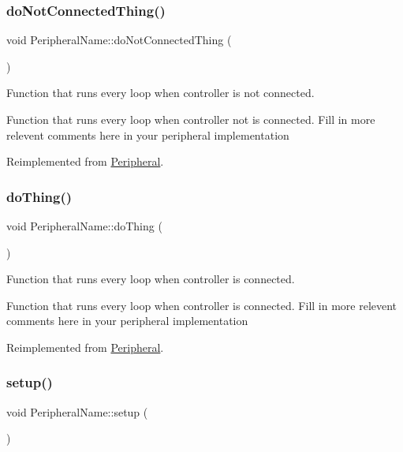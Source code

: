 \subsubsection{\texorpdfstring{do\+Not\+Connected\+Thing()}{doNotConnectedThing()}}
{\footnotesize\ttfamily void Peripheral\+Name\+::do\+Not\+Connected\+Thing (\begin{DoxyParamCaption}{ }\end{DoxyParamCaption})\hspace{0.3cm}{\ttfamily [virtual]}}



Function that runs every loop when controller is not connected. 

Function that runs every loop when controller not is connected. Fill in more relevent comments here in your peripheral implementation 

Reimplemented from \mbox{\hyperlink{class_peripheral_a331e23603fba1cebb2d4745d46ed2bfe}{Peripheral}}.

\mbox{\label{class_peripheral_name_a42388889799a14fd6cda2c2819b0e38d}} 
\subsubsection{\texorpdfstring{do\+Thing()}{doThing()}}
{\footnotesize\ttfamily void Peripheral\+Name\+::do\+Thing (\begin{DoxyParamCaption}{ }\end{DoxyParamCaption})\hspace{0.3cm}{\ttfamily [virtual]}}



Function that runs every loop when controller is connected. 

Function that runs every loop when controller is connected. Fill in more relevent comments here in your peripheral implementation 

Reimplemented from \mbox{\hyperlink{class_peripheral_a8643ea34b0c89019aeff10b0d2667e46}{Peripheral}}.

\mbox{\label{class_peripheral_name_aa6b1719095b6e25d80a2567f400316db}} 
\subsubsection{\texorpdfstring{setup()}{setup()}}
{\footnotesize\ttfamily void Peripheral\+Name\+::setup (\begin{DoxyParamCaption}{ }\end{DoxyParamCaption})\hspace{0.3cm}{\ttfamily [virtual]}}



